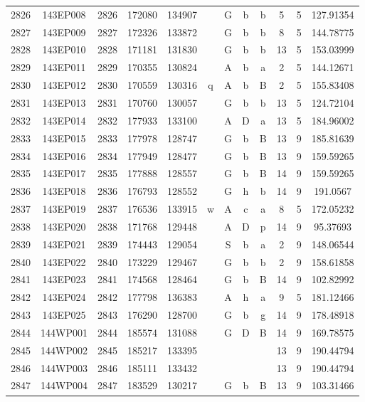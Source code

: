 \begin{tabular}{|*{12}{c|}}
2826 & 143EP008 & 2826 & 172080 & 134907 &  & G & b & b & 5 & 5 & 127.91354 \\ 
2827 & 143EP009 & 2827 & 172326 & 133872 &  & G & b & b & 8 & 5 & 144.78775 \\ 
2828 & 143EP010 & 2828 & 171181 & 131830 &  & G & b & b & 13 & 5 & 153.03999 \\ 
2829 & 143EP011 & 2829 & 170355 & 130824 &  & A & b & a & 2 & 5 & 144.12671 \\ 
2830 & 143EP012 & 2830 & 170559 & 130316 & q & A & b & B & 2 & 5 & 155.83408 \\ 
2831 & 143EP013 & 2831 & 170760 & 130057 &  & G & b & b & 13 & 5 & 124.72104 \\ 
2832 & 143EP014 & 2832 & 177933 & 133100 &  & A & D & a & 13 & 5 & 184.96002 \\ 
2833 & 143EP015 & 2833 & 177978 & 128747 &  & G & b & B & 13 & 9 & 185.81639 \\ 
2834 & 143EP016 & 2834 & 177949 & 128477 &  & G & b & B & 13 & 9 & 159.59265 \\ 
2835 & 143EP017 & 2835 & 177888 & 128557 &  & G & b & B & 14 & 9 & 159.59265 \\ 
2836 & 143EP018 & 2836 & 176793 & 128552 &  & G & h & b & 14 & 9 & 191.0567 \\ 
2837 & 143EP019 & 2837 & 176536 & 133915 & w & A & c & a & 8 & 5 & 172.05232 \\ 
2838 & 143EP020 & 2838 & 171768 & 129448 &  & A & D & p & 14 & 9 & 95.37693 \\ 
2839 & 143EP021 & 2839 & 174443 & 129054 &  & S & b & a & 2 & 9 & 148.06544 \\ 
2840 & 143EP022 & 2840 & 173229 & 129467 &  & G & b & b & 2 & 9 & 158.61858 \\ 
2841 & 143EP023 & 2841 & 174568 & 128464 &  & G & b & B & 14 & 9 & 102.82992 \\ 
2842 & 143EP024 & 2842 & 177798 & 136383 &  & A & h & a & 9 & 5 & 181.12466 \\ 
2843 & 143EP025 & 2843 & 176290 & 128700 &  & G & b & g & 14 & 9 & 178.48918 \\ 
2844 & 144WP001 & 2844 & 185574 & 131088 &  & G & D & B & 14 & 9 & 169.78575 \\ 
2845 & 144WP002 & 2845 & 185217 & 133395 &  &  &  &  & 13 & 9 & 190.44794 \\ 
2846 & 144WP003 & 2846 & 185111 & 133432 &  &  &  &  & 13 & 9 & 190.44794 \\ 
2847 & 144WP004 & 2847 & 183529 & 130217 &  & G & b & B & 13 & 9 & 103.31466 \\ 

\end{tabular}
